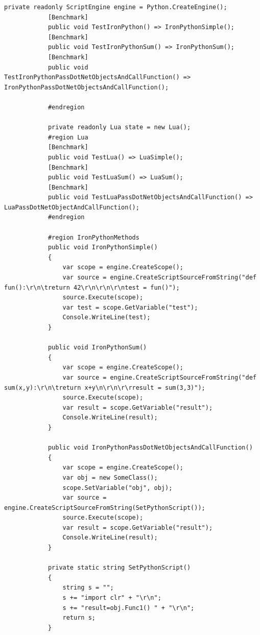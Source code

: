         \begin{lstlisting}[language={[Sharp]C}, caption=IronPythonTestMethods, label= label=lst:imp:pym]
            private readonly ScriptEngine engine = Python.CreateEngine();
            [Benchmark]
            public void TestIronPython() => IronPythonSimple();
            [Benchmark]
            public void TestIronPythonSum() => IronPythonSum();
            [Benchmark]
            public void TestIronPythonPassDotNetObjectsAndCallFunction() => IronPythonPassDotNetObjectsAndCallFunction();
           
            #endregion
        
            private readonly Lua state = new Lua();
            #region Lua
            [Benchmark]
            public void TestLua() => LuaSimple();
            [Benchmark]
            public void TestLuaSum() => LuaSum();
            [Benchmark]
            public void TestLuaPassDotNetObjectsAndCallFunction() => LuaPassDotNetObjectAndCallFunction();
            #endregion
        
            #region IronPythonMethods
            public void IronPythonSimple()
            {
                var scope = engine.CreateScope();
                var source = engine.CreateScriptSourceFromString("def fun():\r\n\treturn 42\r\n\r\n\r\ntest = fun()");
                source.Execute(scope);
                var test = scope.GetVariable("test");
                Console.WriteLine(test);
            }
        
            public void IronPythonSum()
            {
                var scope = engine.CreateScope();
                var source = engine.CreateScriptSourceFromString("def sum(x,y):\r\n\treturn x+y\n\r\n\r\rresult = sum(3,3)");
                source.Execute(scope);
                var result = scope.GetVariable("result");
                Console.WriteLine(result);
            }
        
            public void IronPythonPassDotNetObjectsAndCallFunction() 
            {
                var scope = engine.CreateScope();
                var obj = new SomeClass();
                scope.SetVariable("obj", obj);
                var source = engine.CreateScriptSourceFromString(SetPythonScript());
                source.Execute(scope);
                var result = scope.GetVariable("result");
                Console.WriteLine(result);
            }
        
            private static string SetPythonScript()
            {
                string s = "";
                s += "import clr" + "\r\n";
                s += "result=obj.Func1() " + "\r\n";
                return s;
            }
        
        \end{lstlisting}


